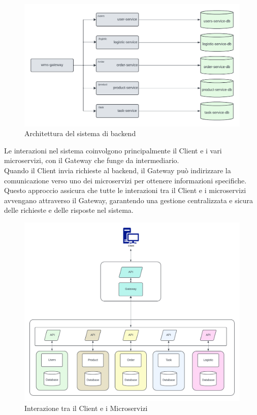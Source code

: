 \begin{figure}[H]
    \centering
    \includegraphics[width=\textwidth]{document/sections/img/architectureServer.png}
    \caption{Architettura del sistema di backend}
    \label{fig:architectureServer}
\end{figure}
Le interazioni nel sistema coinvolgono principalmente il Client e i vari microservizi, con il Gateway
che funge da intermediario.\\Quando il Client invia richieste al backend, il Gateway può indirizzare la
comunicazione verso uno dei microservizi per ottenere informazioni specifiche.\\ Questo approccio assicura
che tutte le interazioni tra il Client e i microservizi avvengano attraverso il Gateway, garantendo una
gestione centralizzata e sicura delle richieste e delle risposte nel sistema.

\begin{figure}[H]
    \centering
    \includegraphics[width=\textwidth]{document/sections/img/serviceInteractions.png}
    \caption{Interazione tra il Client e i Microservizi}
    \label{fig:serviceInteractions}
\end{figure}

